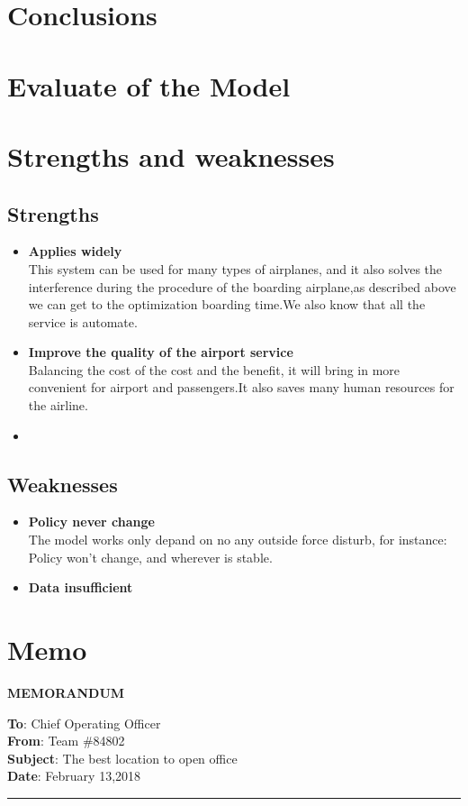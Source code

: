 \documentclass{mcmthesis}
\begin{document}
\section{Conclusions}



\section{Evaluate of the Model}

\section{Strengths and weaknesses}


\subsection{Strengths}
\begin{itemize}
\item \textbf{Applies widely}\\
This  system can be used for many types of airplanes, and it also
solves the interference during  the procedure of the boarding
airplane,as described above we can get to the  optimization
boarding time.We also know that all the service is automate.
\item \textbf{Improve the quality of the airport service}\\
Balancing the cost of the cost and the benefit, it will bring in
more convenient  for airport and passengers.It also saves many
human resources for the airline. \item \textbf{}
\end{itemize}
\cite{chicago}
\subsection{Weaknesses}
\begin{itemize}
\item \textbf{Policy never change}\\
The model works only depand on no any outside force disturb, for instance: Policy won't change, and 
wherever is stable.
\item \textbf{Data insufficient}\\

\end{itemize}
\newpage 
\section{Memo}
\begin{center}
\large {\textbf {MEMORANDUM}}
\end{center}
\textbf {To}: Chief Operating Officer \\
\textbf {From}: Team \#84802 \\
\textbf {Subject}: The best location to open office \\
\textbf {Date}: February 13,2018 \\
\noindent\rule[0.25\baselineskip]{\textwidth}{1pt}
\end{document}

